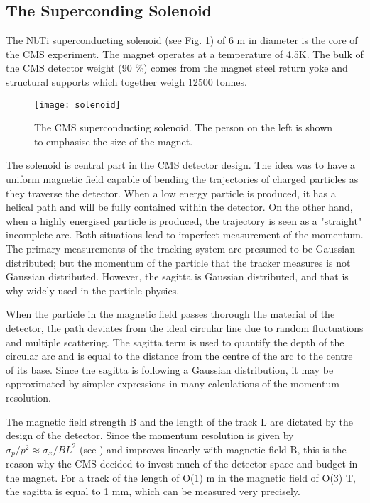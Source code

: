 \begin{normalsize}
\subsection{The Superconding Solenoid}


The NbTi superconducting solenoid (see Fig. \ref{solenoid}) of 6 m in diameter is the core of the CMS experiment. The magnet operates at a temperature of 4.5K. The bulk of the CMS detector weight (90 $\%$) comes from the magnet steel return yoke and structural supports which together weigh 12500 tonnes.
 
 \begin{figure}[H]
  \centering
  \texttt{[image: solenoid]}
  \caption[The CMS superconducting solenoid]{The CMS superconducting solenoid. The person on the left is shown to emphasise the size of the magnet.}
  \label{solenoid}
\end{figure}

The solenoid is central part in the CMS detector design. The idea was to have a uniform magnetic field capable of bending the trajectories of charged particles as they traverse the detector. When a low energy particle is produced, it has a helical path and will be fully contained within the detector. On the other hand, when a highly energised particle is produced, the trajectory is seen as a "straight" incomplete arc. Both situations lead to imperfect measurement of the momentum. The primary measurements of the tracking system are presumed to be Gaussian distributed; but the momentum of the particle that the tracker measures is not Gaussian distributed. However, the sagitta is Gaussian distributed, and that is why widely used in the particle physics. 

When the particle in the magnetic field passes thorough the material of the detector, the path deviates from the ideal circular line due to random fluctuations and multiple scattering. The sagitta term is used to quantify the depth of the circular arc and is equal to the distance from the centre of the arc to the centre of its base. Since the sagitta is following a Gaussian distribution, it may be approximated by simpler expressions in many calculations of the momentum resolution. 

The magnetic field strength B and the length of the track L are dictated by the design of the detector. Since the momentum resolution is given by $\sigma_p / p^2 \approx \sigma_x / B L^2 $ (see \cite {Hauptman:2011zza}) and improves linearly with magnetic field B, this is the reason why the CMS decided to invest much of the detector space and budget in the magnet. For a track of the length of O(1) m in the magnetic field of O(3) T, the sagitta is equal to 1 mm, which can be measured very precisely. 



\end{normalsize}
